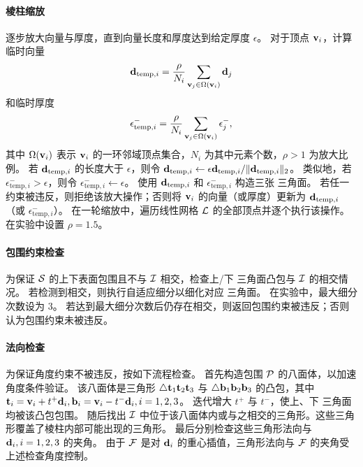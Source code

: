 \paragraph{棱柱缩放}
逐步放大向量与厚度，直到向量长度和厚度达到给定厚度 $\epsilon$。
%
对于顶点 $\mathbf{v}_i$，计算临时向量 $$\mathbf{d}_{\text{temp},i} = \frac{\rho}{N_i} \sum_{\mathbf{v}_j \in \Omega(\mathbf{v}_i)} \mathbf{d}_j$$ 和临时厚度 $$\epsilon^{-}_{\text{temp},i} = \frac{\rho}{N_i} \sum_{\mathbf{v}_j \in \Omega(\mathbf{v}_i)} \epsilon^{-}_j,$$ 其中 $\Omega(\mathbf{v}_i)$ 表示 $\mathbf{v}_i$ 的一环邻域顶点集合，$N_i$ 为其中元素个数，$\rho > 1$ 为放大比例。
%
若 $\mathbf{d}_{\text{temp},i}$ 的长度大于 $\epsilon$，则令 $\mathbf{d}_{\text{temp},i} \leftarrow \epsilon \mathbf{d}_{\text{temp},i}/\|\mathbf{d}_{\text{temp},i}\|_2$。
类似地，若 $\epsilon^{-}_{\text{temp},i}  > \epsilon$，则令 $\epsilon^{-}_{\text{temp},i}  \leftarrow \epsilon$。
%
使用 $\mathbf{d}_{\text{temp},i}$ 和 $\epsilon^{-}_{\text{temp},i} $ 构造三张 \Bezier 三角面。
若任一约束被违反，则拒绝该放大操作；否则将 $\mathbf{v}_i$ 的向量（或厚度）更新为 $\mathbf{d}_{\text{temp},i}$（或 $\epsilon^{-}_{\text{temp},i}$）。
%
在一轮缩放中，遍历线性网格 $\mathcal{L}$ 的全部顶点并逐个执行该操作。
%
在实验中设置 $\rho = 1.5$。


\paragraph{包围约束检查}
为保证 $\mathcal{S}$ 的上下表面包围且不与 $\mathcal{I}$ 相交，检查上/下 \Bezier 三角面凸包与 $\mathcal{I}$ 的相交情况。
%
若检测到相交，则执行自适应细分以细化对应 \Bezier 三角面。
在实验中，最大细分次数设为 3。
%
若达到最大细分次数后仍存在相交，则返回包围约束被违反；否则认为包围约束未被违反。

\paragraph{法向检查}
为保证角度约束不被违反，按如下流程检查。
首先构造包围 $\mathcal{P}$ 的八面体，以加速角度条件验证。
%
该八面体是三角形 $\triangle\mathbf{t}_1\mathbf{t}_2\mathbf{t}_3$ 与 $\triangle\mathbf{b}_1\mathbf{b}_2\mathbf{b}_3$ 的凸包，其中 $\mathbf{t}_i=\mathbf{v}_i+t^+ \mathbf{d}_i, \mathbf{b}_i=\mathbf{v}_i-t^- \mathbf{d}_i, i=1,2,3$。
迭代增大 $t^+$ 与 $t^-$，使上、下 \Bezier 三角面均被该凸包包围。 %
%
随后找出 $\mathcal{I}$ 中位于该八面体内或与之相交的三角形。这些三角形覆盖了棱柱内部可能出现的三角形。
%
最后分别检查这些三角形法向与 $\mathbf{d}_i,i=1,2,3$ 的夹角。
由于 $\mathcal{F}$ 是对 $\mathbf{d}_i$ 的重心插值，三角形法向与 $\mathcal{F}$ 的夹角受上述检查角度控制。

